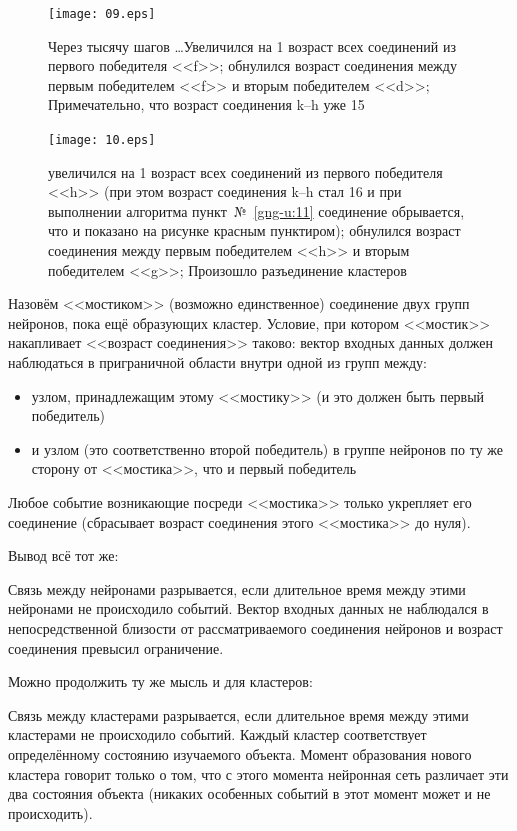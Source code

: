 \documentclass[unicode, 12pt, a4paper,oneside,fleqn]{article}
\begin{document}
\clearpage

\begin{figure}[h]
  \center
  \texttt{[image: 09.eps]}
  \caption{Через тысячу шагов \ldots Увеличился на 1 возраст всех
    соединений из первого победителя <<f>>; обнулился возраст
    соединения между первым победителем <<f>> и вторым победителем
    <<d>>; Примечательно, что возраст соединения k--h уже 15}
  \label{conn-step:09}
\end{figure}

\begin{figure}[h]
  \center
  \texttt{[image: 10.eps]}
  \caption{увеличился на 1 возраст всех соединений из первого
    победителя <<h>> (при этом возраст соединения k--h стал 16 и при
    выполнении алгоритма пункт~№~\ref{gng-u:11} соединение обрывается,
    что и показано на рисунке красным пунктиром); обнулился возраст
    соединения между первым победителем <<h>> и вторым победителем
    <<g>>; Произошло разъединение кластеров}
  \label{conn-step:10}
\end{figure}

\clearpage

Назовём <<мостиком>> (возможно единственное) соединение двух групп
нейронов, пока ещё образующих кластер. Условие, при котором <<мостик>>
накапливает <<возраст соединения>> таково: вектор входных данных
должен наблюдаться в приграничной области внутри одной из групп между:
\begin{itemize}
\item узлом, принадлежащим этому <<мостику>> (и это должен быть первый
  победитель)
\item и узлом (это соответственно второй победитель) в группе нейронов
  по ту же сторону от <<мостика>>, что и первый победитель
\end{itemize}
Любое событие возникающие посреди <<мостика>> только укрепляет его
соединение (сбрасывает возраст соединения этого <<мостика>> до нуля).

Вывод всё тот же:

Связь между нейронами разрывается, если длительное время между этими
нейронами не происходило событий. Вектор входных данных не наблюдался
в непосредственной близости от рассматриваемого соединения нейронов и
возраст соединения превысил ограничение.

Можно продолжить ту же мысль и для кластеров:

Связь между кластерами разрывается, если длительное время между этими
кластерами не происходило событий. Каждый кластер соответствует
определённому состоянию изучаемого объекта. Момент образования нового
кластера говорит только о том, что с этого момента нейронная сеть
различает эти два состояния объекта (никаких особенных событий в этот
момент может и не происходить).


\newpage


\end{document}
